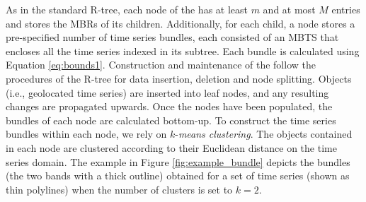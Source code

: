 As in the standard R-tree, each node of the \btsr has at least $m$ and at most $M$ entries and stores the MBRs of its children. Additionally, for each child, a node stores a pre-specified number of time series bundles, each consisted of an MBTS that encloses all the time series indexed in its subtree. Each bundle is calculated using Equation \ref{eq:bounds1}. Construction and maintenance of the \btsr follow the procedures of the R-tree for data insertion, deletion and node splitting. Objects (i.e., geolocated time series) are inserted into leaf nodes, and any resulting changes are propagated upwards. Once the nodes have been populated, the bundles of each node are calculated bottom-up. To construct the time series bundles within each node, we rely on $k$-{\em means clustering}. The objects contained in each node are clustered according to their Euclidean distance on the time series domain. The example in Figure \ref{fig:example_bundle} depicts the bundles (the two bands with a thick outline) obtained for a set of time series (shown as thin polylines) when the number of clusters is set to $k=2$.







